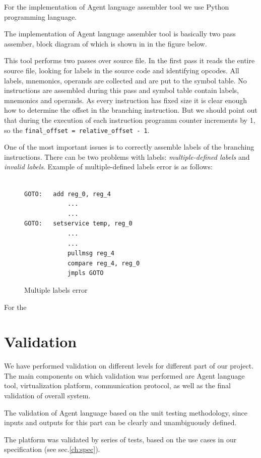 \documentclass{scrreprt}
\begin{document}
For the implementation of Agent language assembler tool we use Python programming language.


The implementation of Agent language assembler tool is basically two pass assember, block diagram of which is shown in 
in the figure below.

This tool performs two passes over source file. In the first pass it reads the entire source file,
looking for labels in the source code and identifying opcodes.
All labels, mnemonics, operands are collected and are put to the symbol table.
No instructions are assembled during this pass and symbol table contain labels, mnemonics and operands.
As every instruction has fixed size it is clear enough how to determine the offset in the branching instruction.
But we should point out that during the execution of each instruction programm counter increments by 1, so the 
\texttt{final_offset = relative_offset - 1}.


One of the most important issues is to correctly assemble labels of the branching instructions.
There can be two problems with labels: \emph{multiple-defined labels} and \emph{invalid labels}.
Example of multiple-defined labels error is as follows:


\begin{figure}[!htb]
\lstset{tabsize=2}
\begin{lstlisting}[frame=single]
	
GOTO:	add reg_0, reg_4
			...
			...
GOTO:	setservice temp, reg_0
			...
			...
			pullmsg reg_4
			compare reg_4, reg_0
			jmpls GOTO
\end{lstlisting}
\caption{Multiple labels error}
\label{fig:multlabels}
\end{figure}

For the 


\chapter{Validation}

We have performed validation on different levels for different part of our project.
The main components on which validation was performed are Agent language tool,
virtualization platform, communication protocol, as well as the final 
validation of overall system.


The validation of Agent language based on the unit testing methodology,
since inputs and outputs for this part can be clearly and unambiguously defined.

The platform was validated by series of tests, based on the use cases
in our specification (see sec.\ref{ch:spec}). 
\end{document}
